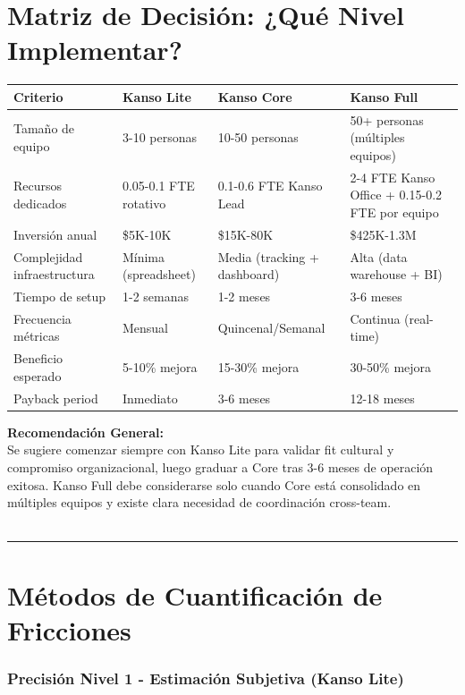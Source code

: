 \section{Matriz de Decisión: ¿Qué Nivel Implementar?}

\begin{center}
\footnotesize
\begin{tabular}{|p{3.5cm}|p{3cm}|p{3cm}|p{3cm}|}
\hline
\textbf{Criterio} & \textbf{Kanso Lite} & \textbf{Kanso Core} & \textbf{Kanso Full} \\ \hline
Tamaño de equipo & 3-10 personas & 10-50 personas & 50+ personas (múltiples equipos) \\ \hline
Recursos dedicados & 0.05-0.1 FTE rotativo & 0.1-0.6 FTE Kanso Lead & 2-4 FTE Kanso Office + 0.15-0.2 FTE por equipo \\ \hline
Inversión anual & \$5K-10K & \$15K-80K & \$425K-1.3M \\ \hline
Complejidad infraestructura & Mínima (spreadsheet) & Media (tracking + dashboard) & Alta (data warehouse + BI) \\ \hline
Tiempo de setup & 1-2 semanas & 1-2 meses & 3-6 meses \\ \hline
Frecuencia métricas & Mensual & Quincenal/Semanal & Continua (real-time) \\ \hline
Beneficio esperado & 5-10\% mejora & 15-30\% mejora & 30-50\% mejora \\ \hline
Payback period & Inmediato & 3-6 meses & 12-18 meses \\ \hline
\end{tabular}
\end{center}

\textbf{Recomendación General:}\\
Se sugiere comenzar siempre con Kanso Lite para validar fit cultural y compromiso organizacional, luego graduar a Core tras 3-6 meses de operación exitosa. Kanso Full debe considerarse solo cuando Core está consolidado en múltiples equipos y existe clara necesidad de coordinación cross-team.
\\
\\
\hrule
\section{Métodos de Cuantificación de Fricciones}

\subsubsection{Precisión Nivel 1 - Estimación Subjetiva (Kanso Lite)}

